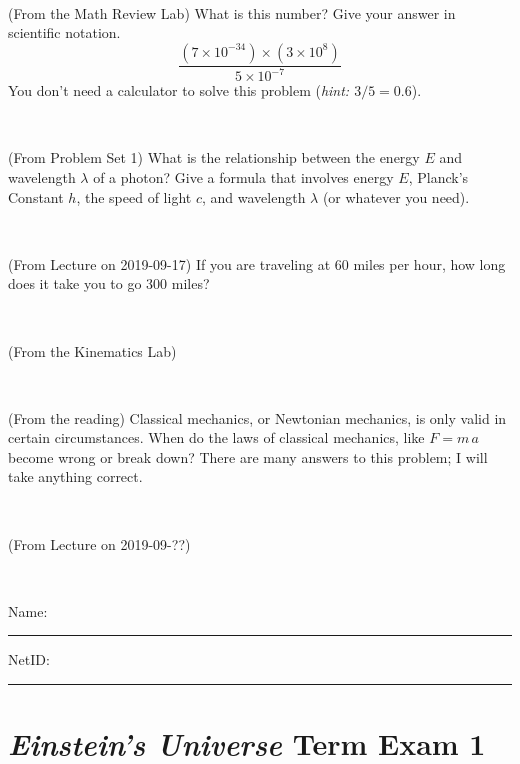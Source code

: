 \documentclass[12pt, letterpaper]{article}
\begin{document}
\vfill ~

\begin{problem} (From the Math Review Lab)
What is this number? Give your answer in scientific notation.
$$
\frac{(7\times10^{-34})\times(3\times10^8)}{5\times10^{-7}}
$$
You don't need a calculator to solve this problem (\textit{hint: $3/5=0.6$}).
\end{problem}


\vfill ~

\begin{problem} (From Problem Set 1)
What is the relationship between the energy $E$ and wavelength
$\lambda$ of a photon? Give a formula that involves energy $E$,
Planck's Constant $h$, the speed of light $c$, and wavelength
$\lambda$ (or whatever you need).
\end{problem}

\vfill ~


\clearpage


\begin{problem} (From Lecture on 2019-09-17)
If you are traveling at 60 miles per hour, how long does
it take you to go 300 miles?
\end{problem}


\vfill ~

\begin{problem} (From the Kinematics Lab)

\end{problem}


\vfill ~

\begin{problem} (From the reading)
Classical mechanics, or Newtonian mechanics, is only valid in certain
circumstances. When do the laws of classical mechanics, like $F =
m\,a$ become wrong or break down? There are many answers to this
problem; I will take anything correct.
\end{problem}


\vfill ~

\begin{problem} (From Lecture on 2019-09-??)
\end{problem}


\vfill ~


\cleardoublepage



\noindent
Name: \rule[-1ex]{0.60\textwidth}{0.1pt}
NetID: \rule[-1ex]{0.20\textwidth}{0.1pt}

\section*{\textsl{Einstein's Universe} Term Exam 1}
\setcounter{problem}{1}
\end{document}
